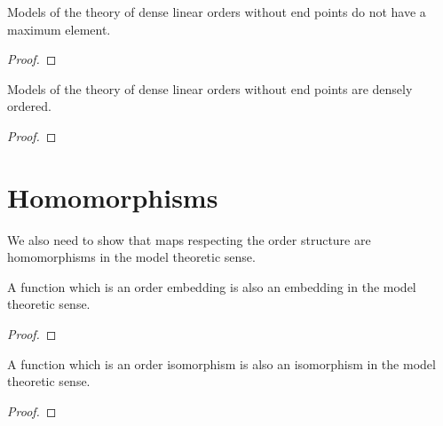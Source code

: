 \begin{lemma}
    \label{lem:no-max-order-dlo}
    \leanok
    Models of the theory of dense linear orders without end points do not have a maximum element.
\end{lemma}
\begin{proof}
    \leanok
\end{proof}

\begin{lemma}
    \label{lem:densely-ordered-dlo}
    \leanok
    Models of the theory of dense linear orders without end points are densely ordered.
\end{lemma}
\begin{proof}
    \leanok
\end{proof}


\section{Homomorphisms}

We also need to show that maps respecting the order structure are homomorphisms in the model theoretic sense.

\begin{lemma}
    \label{lem:to-embedding}
    \leanok
    A function which is an order embedding is also an embedding in the model theoretic sense.
\end{lemma}
\begin{proof}
    \leanok
\end{proof}

\begin{lemma}
    \label{lem:to-isomorphism}
    \leanok
    A function which is an order isomorphism is also an isomorphism in the model theoretic sense.
\end{lemma}
\begin{proof}
    \leanok
\end{proof}


